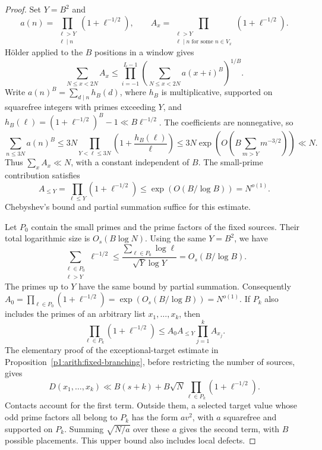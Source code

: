 \begin{proof}
Set $Y=B^2$ and
\[
 a(n)=\prod_{\substack{\ell>Y\\\ell\mid n}}(1+\ell^{-1/2}),\qquad
 A_x=\prod_{\substack{\ell>Y\\\ell\mid n\text{ for some }n\in V_x}}
                                    (1+\ell^{-1/2}).
\]
H\"older applied to the $B$ positions in a window gives
\[
 \sum_{N\leq x<2N}A_x
 \leq\prod_{i=-1}^{L-1}
          \left(\sum_{N\leq x<2N}a(x+i)^B\right)^{1/B}.
\]
Write $a(n)^B=\sum_{d\mid n}h_B(d)$, where $h_B$ is multiplicative,
supported on squarefree integers with primes exceeding $Y$, and
$h_B(\ell)=(1+\ell^{-1/2})^B-1\ll B\ell^{-1/2}$.
The coefficients are nonnegative, so
\[
 \sum_{n\leq3N}a(n)^B
 \leq3N\prod_{Y<\ell\leq3N}\left(1+\frac{h_B(\ell)}\ell\right)
 \leq3N\exp\left(O\left(B\sum_{m>Y}m^{-3/2}\right)\right)
 \ll N.
\]
Thus $\sum_xA_x\ll N$, with a constant independent of $B$.
The small-prime contribution satisfies
\[
 A_{\leq Y}=\prod_{\ell\leq Y}(1+\ell^{-1/2})
       \leq\exp(O(B/\log B))=N^{o(1)}.
\]
Chebyshev's bound and partial summation suffice for this estimate.

Let $P_0$ contain the small primes and the prime factors of the fixed
sources. Their total logarithmic size is $O_s(B\log N)$.
Using the same $Y=B^2$, we have
\[
 \sum_{\substack{\ell\in P_0\\\ell>Y}}\ell^{-1/2}
 \leq\frac{\sum_{\ell\in P_0}\log\ell}{\sqrt Y\log Y}
       =O_s(B/\log B).
\]
The primes up to $Y$ have the same bound by partial summation.
Consequently $A_0=\prod_{\ell\in P_0}(1+\ell^{-1/2})
=\exp(O_s(B/\log B))=N^{o(1)}$.
If $P_k$ also includes the primes of an
arbitrary list $x_1,\ldots,x_k$, then
\[
 \prod_{\ell\in P_k}(1+\ell^{-1/2})
       \leq A_0A_{\leq Y}\prod_{j=1}^k A_{x_j}.
\]
The elementary proof of the exceptional-target estimate
in Proposition~\ref{p1:arith:fixed-branching}, before restricting the
number of sources, gives
\begin{equation}
 D(x_1,\ldots,x_k)
 \ll B(s+k)+B\sqrt N\prod_{\ell\in P_k}(1+\ell^{-1/2}).
 \label{p13:transfer:explicit-exception}
\end{equation}
Contacts account for the first term. Outside them, a selected target
value whose odd prime factors all belong to $P_k$ has the form $a v^2$,
with $a$ squarefree and supported on $P_k$. Summing
$\sqrt{N/a}$ over these $a$ gives the second term, with $B$ possible
placements. This upper bound also includes local defects.


\end{proof}
